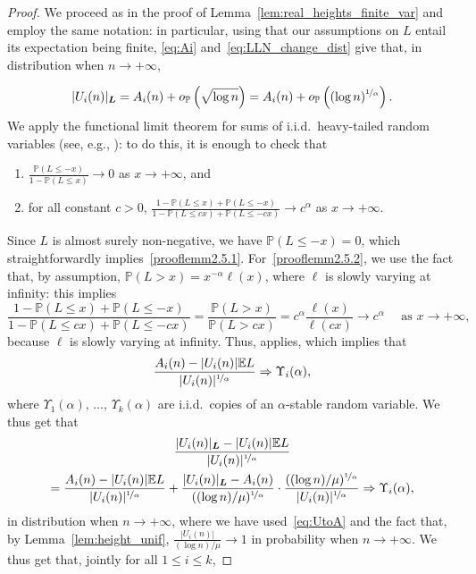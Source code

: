 \documentclass[10pt]{amsart}
\theoremstyle{definition}\newtheorem{defi}[theo]{Definition}\newtheorem{rema}[theo]{Remark}\newtheorem{exam}[theo]{Example}\newtheorem{exem}[theo]{Example}\newtheorem{nota}[theo]{Notation}
\newcommand{\bs}{\ensuremath{\boldsymbol}}
\newcommand{\op}{{o_{\bbP}}}
\newcommand{\bbP}{\mathbb{P}}
\newcommand{\bbE}{\mathbb{E}}
\newcommand*{\romanenumi}{\renewcommand*{\theenumi}{\roman{enumi}}}
\begin{document}
\begin{proof}
We proceed as in the proof of Lemma~\ref{lem:real_heights_finite_var} and employ the same notation: in particular, using that our assumptions on $L$ entail its expectation being finite, \eqref{eq:Ai} and~\eqref{eq:LLN_change_dist} give that, in distribution when $n\to+\infty$,

\begin{equation}\label{eq:UtoA}
|U_i(n)|_{\bs L} = A_i(n)+o_{\bbP}\left(\sqrt{\log n}\right) = A_i(n)+\op\left((\log n)^{\nicefrac1\alpha}\right).
\end{equation}
We apply the functional limit theorem for sums of i.i.d.\ heavy-tailed random variables (see, e.g., \cite[\S~35, Theorem~2]{GK}): to do this, it is enough to check that
\begin{enumerate}\romanenumi
\item\label{prooflemm2.5.1} $\frac{\bbP(L\leq -x)}{1-\bbP(L\leq x)}\to 0$ as $x\to+\infty$, and
\item\label{prooflemm2.5.2} for all constant $c>0$, $\frac{1-\bbP(L\leq x)+\bbP(L\leq -x)}{1-\bbP(L\leq cx)+\bbP(L\leq -cx)}\to c^\alpha$ as $x\to+\infty$.
\end{enumerate}
Since $L$ is almost surely non-negative, we have $\bbP(L\leq -x) = 0$, which straightforwardly implies~\eqref{prooflemm2.5.1}. For~\eqref{prooflemm2.5.2}, we use the fact that, by assumption, $\bbP(L> x) = x^{-\alpha}\ell(x)$, where $\ell$ is slowly varying at infinity: this implies
\[
\frac{1-\bbP(L\leq x)+\bbP(L\leq -x)}{1-\bbP(L\leq cx)+\bbP(L\leq -cx)} = \frac{\bbP(L>x)}{\bbP(L>cx)} = c^\alpha\frac{\ell(x)}{\ell(cx)}\to c^\alpha \quad\text{ as }x\to+\infty,
\]
because $\ell$ is slowly varying at infinity. Thus, \cite[\S~25, Theorem~2]{GK} applies, which implies that
\[
\frac{A_i(n)-|U_i(n)|\bbE L}{|U_i(n)|^{\nicefrac1\alpha}}\Rightarrow \Upsilon_i(\alpha),
\]
where $\Upsilon_1(\alpha), \,\ldots,\, \Upsilon_k(\alpha)$ are i.i.d.\ copies of an $\alpha$-stable random variable. We thus get that
\begin{multline*}
\frac{|U_i(n)|_{\bs L} - |U_i(n)|\bbE L}{|U_i(n)|^{\nicefrac1\alpha}}\\
= \frac{A_i(n)-|U_i(n)|\bbE L}{|U_i(n)|^{\nicefrac1\alpha}} + \frac{|U_i(n)|_{\bs L}-A_i(n)}{((\log n)/\mu)^{\nicefrac1\alpha}}
\cdot\frac{((\log n)/\mu)^{\nicefrac1\alpha}}{|U_i(n)|^{\nicefrac1\alpha}}
\Rightarrow \Upsilon_i(\alpha),
\end{multline*}
in distribution when $n\to+\infty$, where we have used~\eqref{eq:UtoA} and the fact that, by Lemma~\ref{lem:height_unif}, $\frac{|U_i(n)|}{(\log n)/\mu} \to 1$ in probability when $n\to+\infty$. We thus get that, jointly for all $1\leq i\leq k$,

\end{proof}
\end{document}

